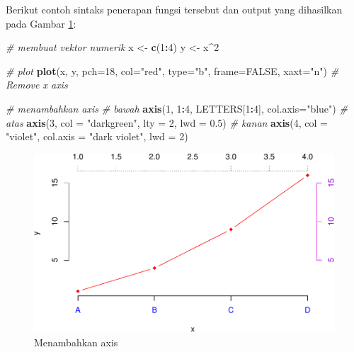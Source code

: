 \documentclass[]{book}
\newenvironment{Shaded}{\begin{snugshade}}{\end{snugshade}}
\newcommand{\KeywordTok}[1]{\textcolor[rgb]{0.13,0.29,0.53}{\textbf{#1}}}
\newcommand{\DataTypeTok}[1]{\textcolor[rgb]{0.13,0.29,0.53}{#1}}
\newcommand{\DecValTok}[1]{\textcolor[rgb]{0.00,0.00,0.81}{#1}}
\newcommand{\FloatTok}[1]{\textcolor[rgb]{0.00,0.00,0.81}{#1}}
\newcommand{\StringTok}[1]{\textcolor[rgb]{0.31,0.60,0.02}{#1}}
\newcommand{\CommentTok}[1]{\textcolor[rgb]{0.56,0.35,0.01}{\textit{#1}}}
\newcommand{\OtherTok}[1]{\textcolor[rgb]{0.56,0.35,0.01}{#1}}
\newcommand{\OperatorTok}[1]{\textcolor[rgb]{0.81,0.36,0.00}{\textbf{#1}}}
\newcommand{\NormalTok}[1]{#1}
\begin{document}
Berikut contoh sintaks penerapan fungsi tersebut dan output yang
dihasilkan pada Gambar \ref{fig:axis}:

\begin{Shaded}
\begin{Highlighting}[]
\CommentTok{# membuat vektor numerik}
\NormalTok{x <-}\StringTok{ }\KeywordTok{c}\NormalTok{(}\DecValTok{1}\OperatorTok{:}\DecValTok{4}\NormalTok{)}
\NormalTok{y <-}\StringTok{ }\NormalTok{x}\OperatorTok{^}\DecValTok{2}

\CommentTok{# plot}
\KeywordTok{plot}\NormalTok{(x, y, }\DataTypeTok{pch=}\DecValTok{18}\NormalTok{, }\DataTypeTok{col=}\StringTok{"red"}\NormalTok{, }\DataTypeTok{type=}\StringTok{"b"}\NormalTok{,}
     \DataTypeTok{frame=}\OtherTok{FALSE}\NormalTok{, }\DataTypeTok{xaxt=}\StringTok{"n"}\NormalTok{) }\CommentTok{# Remove x axis}

\CommentTok{# menambahkan axis}
\CommentTok{# bawah}
\KeywordTok{axis}\NormalTok{(}\DecValTok{1}\NormalTok{, }\DecValTok{1}\OperatorTok{:}\DecValTok{4}\NormalTok{, LETTERS[}\DecValTok{1}\OperatorTok{:}\DecValTok{4}\NormalTok{], }\DataTypeTok{col.axis=}\StringTok{"blue"}\NormalTok{)}
\CommentTok{# atas}
\KeywordTok{axis}\NormalTok{(}\DecValTok{3}\NormalTok{, }\DataTypeTok{col =} \StringTok{"darkgreen"}\NormalTok{, }\DataTypeTok{lty =} \DecValTok{2}\NormalTok{, }\DataTypeTok{lwd =} \FloatTok{0.5}\NormalTok{)}
\CommentTok{# kanan}
\KeywordTok{axis}\NormalTok{(}\DecValTok{4}\NormalTok{, }\DataTypeTok{col =} \StringTok{"violet"}\NormalTok{, }\DataTypeTok{col.axis =} \StringTok{"dark violet"}\NormalTok{, }\DataTypeTok{lwd =} \DecValTok{2}\NormalTok{)}
\end{Highlighting}
\end{Shaded}

\begin{figure}

{\centering \includegraphics[width=0.7\linewidth]{EnvStat_files/figure-latex/axis-1} 

}

\caption{Menambahkan axis}\label{fig:axis}
\end{figure}
\end{document}
